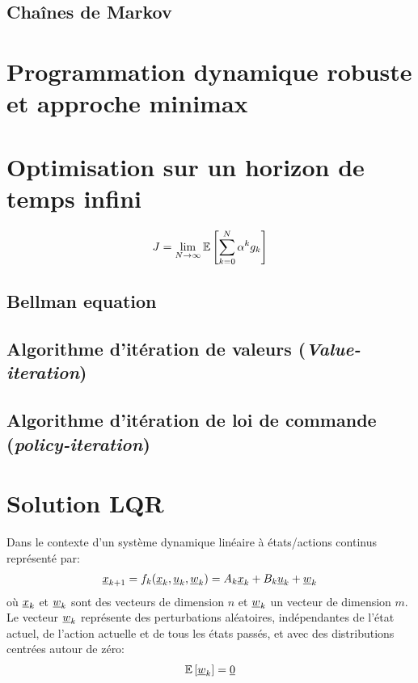 \subsection{Chaînes de Markov}



\section{Programmation dynamique robuste et approche minimax}




\section{Optimisation sur un horizon de temps infini}

\begin{align}
    J = 
    \lim_{N\rightarrow \infty}
    {\mathbb E}\left[  \sum_{k=0}^{N} 
    \alpha^k
    g_k
     \right]
\end{align}

\subsection{Bellman equation}


\subsection{Algorithme d'itération de valeurs (\textit{Value-iteration})}

\subsection{Algorithme d'itération de loi de commande (\textit{policy-iteration})}


\section{Solution LQR}

Dans le contexte d'un système dynamique linéaire à états/actions continus représenté par:
\begin{align}
    \underline{x}_{k+1} = f_k(\underline{x}_k , \underline{u}_k , \underline{w}_k )  = A_k \underline{x}_k + B_k \underline{u}_k + \underline{w}_k
\end{align}
où $\underline{x}_k$ et $\underline{w}_k$ sont des vecteurs de dimension $n$ et $\underline{w}_k$ un vecteur de dimension $m$. Le vecteur $\underline{w}_k$ représente des perturbations aléatoires, indépendantes de l'état actuel, de l'action actuelle et de tous les états passés, et avec des distributions centrées autour de zéro: 
\begin{align}
    \e{\col{w}_k} = \col{0} %
\end{align}

